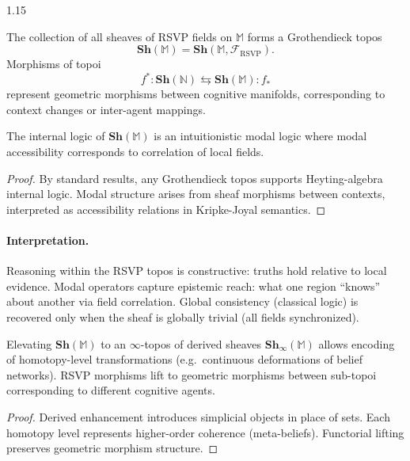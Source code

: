 \documentclass[12pt,a4paper]{article}
\begin{document}
\begin{spacing}{1.15}
\begin{definition}
\label{def:topos}
The collection of all sheaves of RSVP fields on \(\mathbb{M}\)
forms a Grothendieck topos
\[
  \mathbf{Sh}(\mathbb{M}) = \mathbf{Sh}(\mathbb{M},\mathscr{F}_{\mathrm{RSVP}}).
\]
Morphisms of topoi
\[
  f^* : \mathbf{Sh}(\mathbb{N}) \leftrightarrows \mathbf{Sh}(\mathbb{M}) : f_*
\]
represent geometric morphisms between cognitive manifolds,
corresponding to context changes or inter-agent mappings.
\end{definition}

\begin{theorem}
\label{thm:logic}
The internal logic of \(\mathbf{Sh}(\mathbb{M})\)
is an intuitionistic modal logic
where modal accessibility
corresponds to correlation of local fields.
\end{theorem}

\begin{proof}
By standard results, any Grothendieck topos supports
Heyting-algebra internal logic.
Modal structure arises from sheaf morphisms between contexts,
interpreted as accessibility relations in Kripke-Joyal semantics.
\end{proof}

\paragraph{Interpretation.}
Reasoning within the RSVP topos is constructive:
truths hold relative to local evidence.
Modal operators capture epistemic reach:
what one region “knows” about another via field correlation.
Global consistency (classical logic) is recovered only
when the sheaf is globally trivial (all fields synchronized).

\begin{proposition}
\label{prop:inftopos}
Elevating \(\mathbf{Sh}(\mathbb{M})\)
to an \(\infty\)-topos of derived sheaves
\(\mathbf{Sh}_{\infty}(\mathbb{M})\)
allows encoding of homotopy-level transformations
(e.g.\ continuous deformations of belief networks).
RSVP morphisms lift to geometric morphisms
between sub-topoi corresponding to different cognitive agents.
\end{proposition}

\begin{proof}
Derived enhancement introduces simplicial objects in place of sets.
Each homotopy level represents higher-order coherence (meta-beliefs).
Functorial lifting preserves geometric morphism structure.
\end{proof}


\end{spacing}
\end{document}
